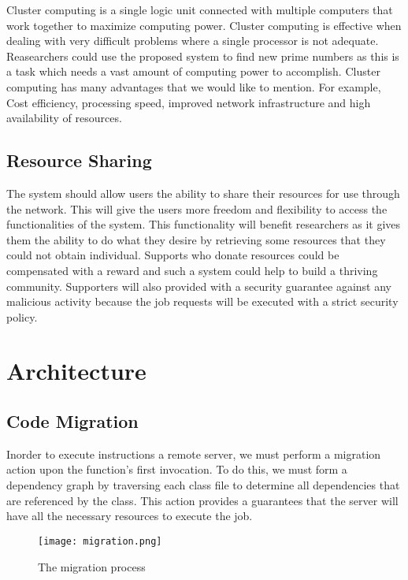 \documentclass[12pt, oneside,english]{article}
\begin{document}
    Cluster computing is a single logic unit connected with multiple
    computers that work together to maximize computing power.
    Cluster computing is effective when dealing with very difficult
    problems where a single processor is not adequate. Reasearchers could
    use the proposed system to find new prime numbers as this is a
    task which needs a vast amount of computing power to accomplish.
    Cluster computing has many advantages that we would like to mention.
    For example, Cost efficiency, processing speed, improved network
    infrastructure and high availability of resources.

    \subsection{Resource Sharing}

    The system should allow users the ability to share their
    resources for use through the network. This will give the
    users more freedom and flexibility to access the functionalities
    of the system. This functionality will benefit researchers as
    it gives them the ability to do what they desire by retrieving
    some resources that they could not obtain individual.
    Supports who donate resources could be compensated with a reward
    and such a system could help to build a thriving community.
    Supporters will also provided with a security guarantee against
    any malicious activity because the job requests will be executed
    with a strict security policy.

    \section{Architecture}\label{sec:architecture}

    \subsection{Code Migration}\label{subsec:migration}

    Inorder to execute instructions a remote server, we must perform a migration action
    upon the function's first invocation. To do this, we must form a dependency graph
    by traversing each class file to determine all dependencies that are referenced by the class.
    This action provides a guarantees that the server will have all the necessary resources
    to execute the job.

    \begin{figure}[H]
        \centering
        \texttt{[image: migration.png]}
        \caption{The migration process}
    \end{figure}
\end{document}

